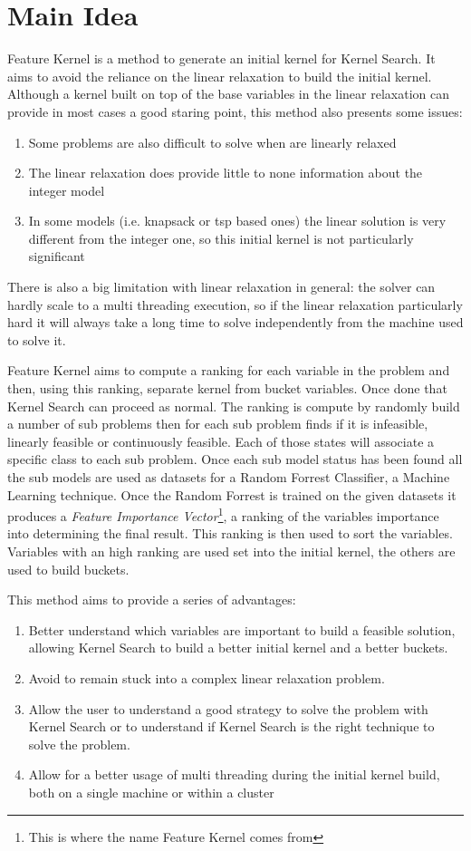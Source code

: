 \section{Main Idea}
Feature Kernel  is a method to generate an initial kernel for Kernel Search. 
It aims to avoid the reliance on the linear relaxation to build the initial 
kernel. Although a kernel built on top of the base variables in the linear relaxation can provide in most
cases a good staring point, this method also presents some issues:
\begin{enumerate}
    \item Some problems are also difficult to solve when are linearly relaxed
    \item The linear relaxation does provide little to none information about the integer model
    \item In some models (i.e. knapsack or tsp based ones) the linear solution is very different from 
    the integer one, so this initial kernel is not particularly significant 
\end{enumerate}

There is also a big limitation with linear relaxation in general: the solver can hardly scale to a multi threading execution, so 
if the linear relaxation particularly  hard it will always take a long time to solve independently from the machine used to solve it.

Feature Kernel aims to compute a ranking for each variable in the problem and then, using this ranking, separate kernel from bucket variables. Once 
done that Kernel Search can proceed as normal. The ranking is compute by randomly build a number of sub problems then for each sub problem finds if it
is infeasible, linearly feasible or continuously feasible. Each of those states will associate a specific class to each sub problem. Once each sub model status
has been found all the sub models are used as datasets for a Random Forrest Classifier, a Machine Learning technique. Once the Random Forrest is trained on
the given datasets it produces a \emph{Feature Importance Vector}\footnote{This is where the name Feature Kernel comes from}, a ranking of the variables importance into determining the final result. 
This ranking is then used to sort the variables. Variables with an high ranking are used set into the initial kernel, the others are used to build buckets.

This method aims to provide a series of advantages:
\begin{enumerate}
    \item Better understand which variables are important to build a feasible solution, allowing Kernel Search to build a better initial kernel and a better buckets.
    \item Avoid to remain stuck into a complex linear relaxation problem.
    \item Allow the user to understand a good strategy to solve the problem with Kernel Search or to understand if Kernel Search is the right technique to solve the problem.
    \item Allow for a better usage of multi threading during the initial kernel build, both on a single machine or within a cluster
\end{enumerate}


